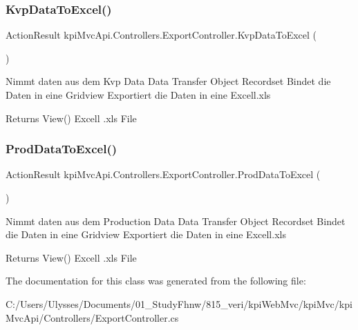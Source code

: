 \subsubsection{\texorpdfstring{Kvp\+Data\+To\+Excel()}{KvpDataToExcel()}}
{\footnotesize\ttfamily Action\+Result kpi\+Mvc\+Api.\+Controllers.\+Export\+Controller.\+Kvp\+Data\+To\+Excel (\begin{DoxyParamCaption}{ }\end{DoxyParamCaption})\hspace{0.3cm}{\ttfamily [inline]}}



Nimmt daten aus dem Kvp Data Data Transfer Object Recordset Bindet die Daten in eine Gridview Exportiert die Daten in eine Excell.\+xls 

\begin{DoxyReturn}{Returns}
View() Excell .xls File 
\end{DoxyReturn}
\mbox{\label{classkpi_mvc_api_1_1_controllers_1_1_export_controller_a7f779c9cca92a11fd9c37bfef15c0ad4}} 
\subsubsection{\texorpdfstring{Prod\+Data\+To\+Excel()}{ProdDataToExcel()}}
{\footnotesize\ttfamily Action\+Result kpi\+Mvc\+Api.\+Controllers.\+Export\+Controller.\+Prod\+Data\+To\+Excel (\begin{DoxyParamCaption}{ }\end{DoxyParamCaption})\hspace{0.3cm}{\ttfamily [inline]}}



Nimmt daten aus dem Production Data Data Transfer Object Recordset Bindet die Daten in eine Gridview Exportiert die Daten in eine Excell.\+xls 

\begin{DoxyReturn}{Returns}
View() Excell .xls File 
\end{DoxyReturn}


The documentation for this class was generated from the following file\+:\begin{DoxyCompactItemize}
\item 
C\+:/\+Users/\+Ulysses/\+Documents/01\+\_\+\+Study\+Fhnw/815\+\_\+veri/kpi\+Web\+Mvc/kpi\+Mvc/kpi\+Mvc\+Api/\+Controllers/Export\+Controller.\+cs\end{DoxyCompactItemize}
